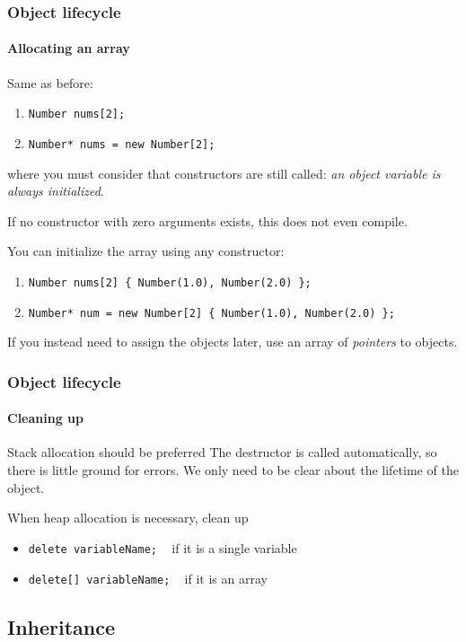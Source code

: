 \begin{frame}
\frametitle{Object lifecycle}
\framesubtitle{Allocating an array}

\begin{block}{Same as before:}
\begin{enumerate}
\item {\scriptsize \texttt{Number nums[2]; }}
\item {\scriptsize \texttt{Number* nums = new Number[2]; }}
\end{enumerate}
where you must consider that constructors are still called: {\em an object variable is always initialized}. 

If no constructor with zero arguments exists, this does not even compile. 
\end{block}
\begin{block}{You can initialize the array using any constructor:}
\begin{enumerate}
\item {\scriptsize \texttt{Number nums[2] \{ Number(1.0), Number(2.0) \}; } }
\item {\scriptsize \texttt{Number* num = new Number[2] \{ Number(1.0), Number(2.0) \}; } }
\end{enumerate}
If you instead need to assign the objects later, use an array of {\em pointers} to objects.
\end{block}

\end{frame}

\begin{frame}
\frametitle{Object lifecycle}
\framesubtitle{Cleaning up}

\begin{block}{Stack allocation should be preferred}
The destructor is called automatically, so there is little ground for errors. We only need to be clear about the lifetime of the object.
\end{block}
\pause
\begin{block}{When heap allocation is necessary, clean up}
\begin{itemize}
\item \texttt{delete variableName;} \,\,\, if it is a single variable
\item \texttt{delete[] variableName;} \,\,\, if it is an array
\end{itemize}
\end{block}
\end{frame}

\subsection{Inheritance}

